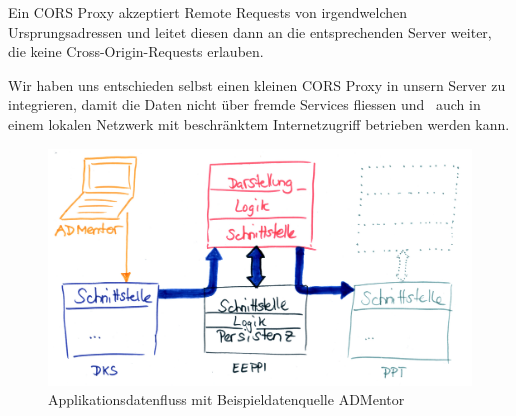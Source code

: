 			Ein CORS Proxy akzeptiert Remote Requests von irgendwelchen Ursprungsadressen und leitet diesen dann
			an die entsprechenden Server weiter, die keine Cross-Origin-Requests erlauben.
			
			Wir haben uns entschieden selbst einen kleinen CORS Proxy in unsern Server zu integrieren,
			damit die Daten nicht über fremde Services fliessen und
			\eeppi\ auch in einem lokalen Netzwerk mit beschränktem Internetzugriff betrieben werden kann.
		
		\begin{figure}[H]
			\includegraphics[width=\textwidth]{architecture/media/img/eeppiDataflow.jpg}
			\centering
			\caption{Applikationsdatenfluss mit Beispieldatenquelle ADMentor}
			\label{fig:applicationDataFlow}
		\end{figure}		